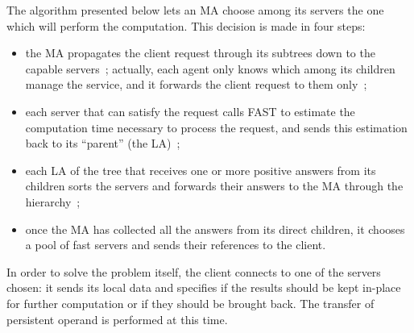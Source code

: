 The algorithm presented below lets an MA choose among its servers the one which
will perform the computation. This decision is made in four steps:
\begin{itemize}
\item the MA propagates the client request through its subtrees down to the
  capable servers~; actually, each agent only knows which among its children manage
  the service, and it forwards the client request to them only~;
\item each server that can satisfy the request calls FAST to estimate the
  computation time necessary to process the request, and sends this
  estimation back to its ``parent'' (the LA)~;
\item each LA of the tree that receives one or more positive answers from its
  children sorts the servers and forwards their answers to the MA through the
  hierarchy~;
\item once the MA has collected all the answers from its direct children, it
  chooses a pool of fast servers and sends their references to the client.
\end{itemize}


In order to solve the problem itself, the client connects to one of the servers
chosen: it sends its local data and specifies if the results should be kept
in-place for further computation or if they should be brought back. The transfer
of persistent operand is performed at this time.

